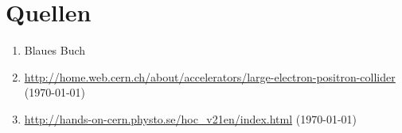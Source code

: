 \documentclass[a4paper,ngerman]{scrartcl}
\begin{document}
\section{Quellen}
\begin{enumerate}
\item Blaues Buch \label{ref:BB}
\item \url{http://home.web.cern.ch/about/accelerators/large-electron-positron-collider}
 (\today) \label{ref:cernlep}
\item \url{http://hands-on-cern.physto.se/hoc_v21en/index.html} (\today)\label{ref:hands-on}
\end{enumerate}
\end{document}
